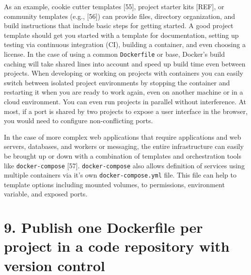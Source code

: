\documentclass[10pt,letterpaper]{article}
\begin{document}
As an example, cookie cutter templates {[}55{]}, project starter kits
{[}REF{]}, or community templates (e.g., {[}56{]}) can provide files,
directory organization, and build instructions that include basic steps
for getting started. A good project template should get you started with
a template for documentation, setting up testing via continuous
integration (CI), building a container, and even choosing a license. In
the case of using a common \texttt{Dockerfile} or base, Docker's build
caching will take shared lines into account and speed up build time even
between projects. When developing or working on projects with containers
you can easily switch between isolated project environments by stopping
the container and restarting it when you are ready to work again, even
on another machine or in a cloud environment. You can even run projects
in parallel without interference. At most, if a port is shared by two
projects to expose a user interface in the browser, you would need to
configure non-conflicting ports.

In the case of more complex web applications that require applications
and web servers, databases, and workers or messaging, the entire
infrastructure can easily be brought up or down with a combination of
templates and orchestration tools like \texttt{docker-compose} {[}57{]}.
\texttt{docker-compose} also allows definition of services using
multiple containers via it's own \texttt{docker-compose.yml} file. This
file can help to template options including mounted volumes, to
permissions, environment variable, and exposed ports.

\hypertarget{publish-one-dockerfile-per-project-in-a-code-repository-with-version-control}{%
\section*{9. Publish one Dockerfile per project in a code repository
with version
control}\label{publish-one-dockerfile-per-project-in-a-code-repository-with-version-control}}

  \label{rule:publish} 
\end{document}
